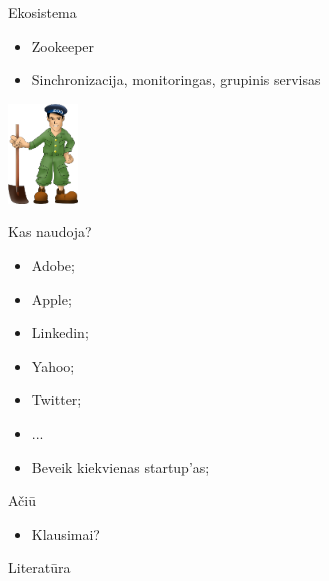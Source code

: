 \documentclass{beamer}
\begin{document}
\begin{frame}[allowframebreaks=0.8]{Ekosistema}
    \framebreak

    \begin{itemize}
      \item Zookeeper
      \item Sinchronizacija, monitoringas, grupinis servisas
    \end{itemize}
    \begin{center}
      \includegraphics[height=100px]{img/zookeeper.png}
    \end{center}

  \end{frame}

  \begin{frame}{Kas naudoja?}
    \begin{itemize}
      \item Adobe;
      \item Apple;
      \item Linkedin;
      \item Yahoo;
      \item Twitter;
      \item ...
      \item Beveik kiekvienas startup'as;
    \end{itemize}
  \end{frame}

  \begin{frame}{Ačiū}
    \begin{itemize}
      \item Klausimai?
    \end{itemize}
  \end{frame}

  \begin{frame}{Literatūra}
    
    
  \end{frame}
\end{document}

